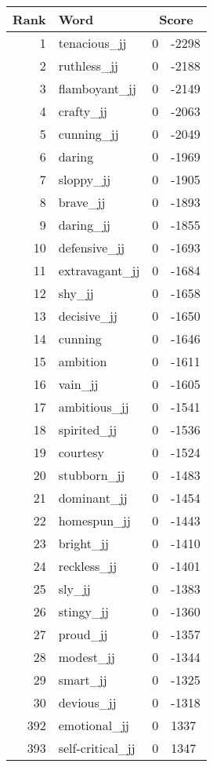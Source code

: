 \begin{longtable}[!htbp]{| rlr@{.}l |}
    \hline
    \textbf{Rank} & \textbf{Word} & \multicolumn{2}{c|}{\textbf{Score}} \\
    \hline
    \endhead
    1 & tenacious\_jj & 0 & -2298 \\
    2 & ruthless\_jj & 0 & -2188 \\
    3 & flamboyant\_jj & 0 & -2149 \\
    4 & crafty\_jj & 0 & -2063 \\
    5 & cunning\_jj & 0 & -2049 \\
    6 & daring & 0 & -1969 \\
    7 & sloppy\_jj & 0 & -1905 \\
    8 & brave\_jj & 0 & -1893 \\
    9 & daring\_jj & 0 & -1855 \\
    10 & defensive\_jj & 0 & -1693 \\
    11 & extravagant\_jj & 0 & -1684 \\
    12 & shy\_jj & 0 & -1658 \\
    13 & decisive\_jj & 0 & -1650 \\
    14 & cunning & 0 & -1646 \\
    15 & ambition & 0 & -1611 \\
    16 & vain\_jj & 0 & -1605 \\
    17 & ambitious\_jj & 0 & -1541 \\
    18 & spirited\_jj & 0 & -1536 \\
    19 & courtesy & 0 & -1524 \\
    20 & stubborn\_jj & 0 & -1483 \\
    21 & dominant\_jj & 0 & -1454 \\
    22 & homespun\_jj & 0 & -1443 \\
    23 & bright\_jj & 0 & -1410 \\
    24 & reckless\_jj & 0 & -1401 \\
    25 & sly\_jj & 0 & -1383 \\
    26 & stingy\_jj & 0 & -1360 \\
    27 & proud\_jj & 0 & -1357 \\
    28 & modest\_jj & 0 & -1344 \\
    29 & smart\_jj & 0 & -1325 \\
    30 & devious\_jj & 0 & -1318 \\
    392 & emotional\_jj & 0 & 1337 \\
    393 & self-critical\_jj & 0 & 1347 \\

\end{longtable}
